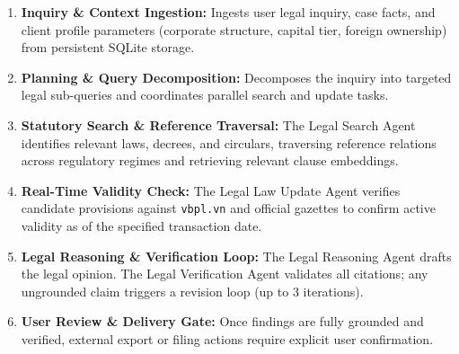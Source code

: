 \begin{enumerate}[label=\textbf{Phase \arabic*:}, leftmargin=18pt]
  \item \textbf{Inquiry \& Context Ingestion:} Ingests user legal inquiry, case facts, and client profile parameters (corporate structure, capital tier, foreign ownership) from persistent SQLite storage.
  \item \textbf{Planning \& Query Decomposition:} Decomposes the inquiry into targeted legal sub-queries and coordinates parallel search and update tasks.
  \item \textbf{Statutory Search \& Reference Traversal:} The Legal Search Agent identifies relevant laws, decrees, and circulars, traversing reference relations across regulatory regimes and retrieving relevant clause embeddings.
  \item \textbf{Real-Time Validity Check:} The Legal Law Update Agent verifies candidate provisions against \texttt{vbpl.vn} and official gazettes to confirm active validity as of the specified transaction date.
  \item \textbf{Legal Reasoning \& Verification Loop:} The Legal Reasoning Agent drafts the legal opinion. The Legal Verification Agent validates all citations; any ungrounded claim triggers a revision loop (up to 3 iterations).
  \item \textbf{User Review \& Delivery Gate:} Once findings are fully grounded and verified, external export or filing actions require explicit user confirmation.
\end{enumerate}

